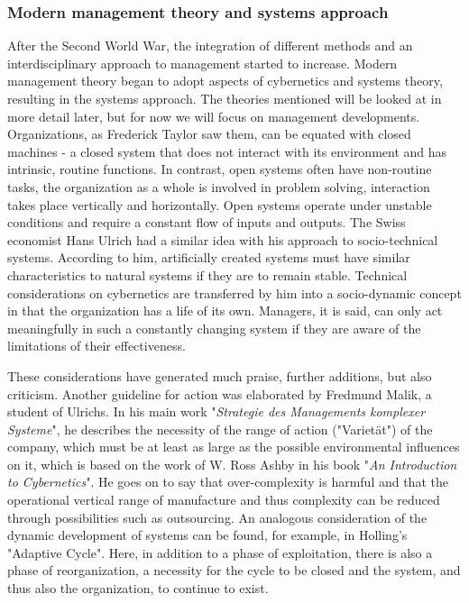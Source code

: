 \documentclass[a4paper,12pt]{scrartcl}
\begin{document}
\subsubsection{Modern management theory and systems approach}
After the Second World War, the integration of different methods and an interdisciplinary approach to management started to increase. Modern management theory began to adopt aspects of cybernetics and systems theory, resulting in the systems approach. The theories mentioned will be looked at in more detail later, but for now we will focus on management developments.
Organizations, as Frederick Taylor saw them, can be equated with closed machines - a closed system that does not interact with its environment and has intrinsic, routine functions. In contrast, open systems often have non-routine tasks, the organization as a whole is involved in problem solving, interaction takes place vertically and horizontally. Open systems operate under unstable conditions and require a constant flow of inputs and outputs. 
The Swiss economist Hans Ulrich had a similar idea with his approach to socio-technical systems. According to him, artificially created systems must have similar characteristics to natural systems if they are to remain stable. Technical considerations on cybernetics are transferred by him into a socio-dynamic concept in that the organization has a life of its own. Managers, it is said, can only act meaningfully in such a constantly changing system if they are aware of the limitations of their effectiveness.\cite{oelsnitz:2009}

These considerations have generated much praise, further additions, but also criticism. Another guideline for action was elaborated by Fredmund Malik, a student of Ulrichs. In his main work "\textit{Strategie des Managements komplexer Systeme}", he describes the necessity of the range of action ("Varietät") of the company, which must be at least as large as the possible environmental influences on it, which is based on the work of W. Ross Ashby in his book "\textit{An Introduction to Cybernetics}".\cite{jackson:1991} He goes on to say that over-complexity is harmful and that the operational vertical range of manufacture and thus complexity can be reduced through possibilities such as outsourcing.\cite{malik:1984}
An analogous consideration of the dynamic development of systems can be found, for example, in Holling's "Adaptive Cycle". Here, in addition to a phase of exploitation, there is also a phase of reorganization, a necessity for the cycle to be closed and the system, and thus also the organization, to continue to exist.\cite{holling:2001}
\end{document}
